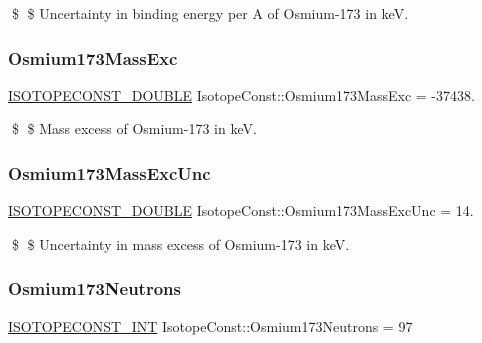 \$ \$ Uncertainty in binding energy per A of Osmium-\/173 in keV. \mbox{\label{group___isotope_const-_osmium-_os173_gaa5de3a50406bd65f1e6b035fab9b1161}} 
\subsubsection{\texorpdfstring{Osmium173\+Mass\+Exc}{Osmium173MassExc}}
{\footnotesize\ttfamily \mbox{\hyperlink{group___isotope_const-_macros_ga8f45a7272ce02c0b4c65c44636ed719a}{I\+S\+O\+T\+O\+P\+E\+C\+O\+N\+S\+T\+\_\+\+D\+O\+U\+B\+LE}} Isotope\+Const\+::\+Osmium173\+Mass\+Exc = -\/37438.}

\$ \$ Mass excess of Osmium-\/173 in keV. \mbox{\label{group___isotope_const-_osmium-_os173_gad496fb6f13e34f5fa27d96afaca92fe8}} 
\subsubsection{\texorpdfstring{Osmium173\+Mass\+Exc\+Unc}{Osmium173MassExcUnc}}
{\footnotesize\ttfamily \mbox{\hyperlink{group___isotope_const-_macros_ga8f45a7272ce02c0b4c65c44636ed719a}{I\+S\+O\+T\+O\+P\+E\+C\+O\+N\+S\+T\+\_\+\+D\+O\+U\+B\+LE}} Isotope\+Const\+::\+Osmium173\+Mass\+Exc\+Unc = 14.}

\$ \$ Uncertainty in mass excess of Osmium-\/173 in keV. \mbox{\label{group___isotope_const-_osmium-_os173_gabe61b53542ee348850fc5208d8712a59}} 
\subsubsection{\texorpdfstring{Osmium173\+Neutrons}{Osmium173Neutrons}}
{\footnotesize\ttfamily \mbox{\hyperlink{group___isotope_const-_macros_ga5f18360b3e99483a35c32d789e62621c}{I\+S\+O\+T\+O\+P\+E\+C\+O\+N\+S\+T\+\_\+\+I\+NT}} Isotope\+Const\+::\+Osmium173\+Neutrons = 97}

